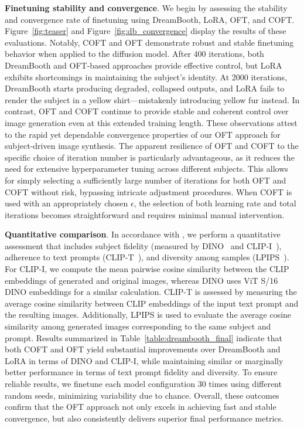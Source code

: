 \textbf{Finetuning stability and convergence}. We begin by assessing the stability and convergence rate of finetuning using DreamBooth, LoRA, OFT, and COFT. Figure~\ref{fig:teaser} and Figure~\ref{fig:db_convergence} display the results of these evaluations. Notably, COFT and OFT demonstrate robust and stable finetuning behavior when applied to the diffusion model. After 400 iterations, both DreamBooth and OFT-based approaches provide effective control, but LoRA exhibits shortcomings in maintaining the subject's identity. At 2000 iterations, DreamBooth starts producing degraded, collapsed outputs, and LoRA fails to render the subject in a yellow shirt—mistakenly introducing yellow fur instead. In contrast, OFT and COFT continue to provide stable and coherent control over image generation even at this extended training length. These observations attest to the rapid yet dependable convergence properties of our OFT approach for subject-driven image synthesis. The apparent resilience of OFT and COFT to the specific choice of iteration number is particularly advantageous, as it reduces the need for extensive hyperparameter tuning across different subjects. This allows for simply selecting a sufficiently large number of iterations for both OFT and COFT without risk, bypassing intricate adjustment procedures. When COFT is used with an appropriately chosen $\epsilon$, the selection of both learning rate and total iterations becomes straightforward and requires minimal manual intervention.

\textbf{Quantitative comparison}. In accordance with \cite{ruiz2023dreambooth}, we perform a quantitative assessment that includes subject fidelity (measured by DINO~\cite{caron2021emerging} and CLIP-I~\cite{radford2021learning}), adherence to text prompts (CLIP-T~\cite{radford2021learning}), and diversity among samples (LPIPS~\cite{zhang2018unreasonable}). For CLIP-I, we compute the mean pairwise cosine similarity between the CLIP embeddings of generated and original images, whereas DINO uses ViT S/16 DINO embeddings for a similar calculation. CLIP-T is assessed by measuring the average cosine similarity between CLIP embeddings of the input text prompt and the resulting images. Additionally, LPIPS is used to evaluate the average cosine similarity among generated images corresponding to the same subject and prompt. Results summarized in Table~\ref{table:dreambooth_final} indicate that both COFT and OFT yield substantial improvements over DreamBooth and LoRA in terms of DINO and CLIP-I, while maintaining similar or marginally better performance in terms of text prompt fidelity and diversity. To ensure reliable results, we finetune each model configuration 30 times using different random seeds, minimizing variability due to chance. Overall, these outcomes confirm that the OFT approach not only excels in achieving fast and stable convergence, but also consistently delivers superior final performance metrics.

